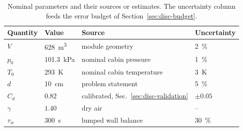 \begin{table}[htbp]
  \centering
  \small
  \caption{Nominal parameters and their sources or estimates. The
  uncertainty column feeds the error budget of
  Section~\ref{sec:disc-budget}.}
  \label{tab:params}
  \begin{tabular}{@{}llll@{}}
    \toprule
    Quantity & Value & Source & Uncertainty \\
    \midrule
    $V$ & \SI{628}{m^3} & module geometry & \SI{2}{\percent} \\
    $p_0$ & \SI{101.3}{kPa} & nominal cabin pressure & \SI{1}{\percent} \\
    $T_0$ & \SI{293}{K} & nominal cabin temperature & \SI{3}{K} \\
    $d$ & \SI{10}{cm} & problem statement & \SI{5}{\percent} \\
    $C_d$ & $0.82$ & calibrated, Sec.~\ref{sec:disc-validation} & $\pm0.05$ \\
    $\gamma$ & $1.40$ & dry air & -- \\
    $\tau_w$ & \SI{300}{s} & lumped wall balance & \SI{30}{\percent} \\
    \bottomrule
  \end{tabular}
\end{table}
